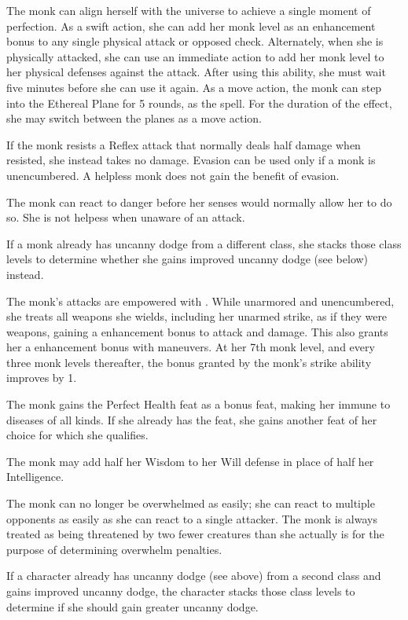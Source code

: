  The monk can align herself with the universe to achieve a single moment of perfection. As a swift action, she can add her monk level as an enhancement bonus to any single physical attack or opposed check. Alternately, when she is physically attacked, she can use an immediate action to add her monk level to her physical defenses against the attack. After using this ability, she must wait five minutes before she can use it again.
 As a move action, the monk can step into the Ethereal Plane for 5 rounds, as the  spell. For the duration of the effect, she may switch between the planes as a move action.

 If the monk resists a Reflex attack that normally deals half damage when resisted, she instead takes no damage. Evasion can be used only if a monk is unencumbered. A helpless monk does not gain the benefit of evasion.

 The monk can react to danger before her senses would normally allow her to do so. She is not helpess when unaware of an attack.

If a monk already has uncanny dodge from a different class, she stacks those class levels to determine whether she gains improved uncanny dodge (see below) instead.

 The monk's attacks are empowered with \ki. While unarmored and unencumbered, she treats all weapons she wields, including her unarmed strike, as if they were  weapons, gaining a  enhancement bonus to attack and damage. This also grants her a  enhancement bonus with maneuvers. At her 7th monk level, and every three monk levels thereafter, the bonus granted by the monk's \ki strike ability improves by 1. 

 The monk gains the Perfect Health feat as a bonus feat, making her immune to diseases of all kinds. If she already has the feat, she gains another feat of her choice for which she qualifies.

 The monk may add half her Wisdom to her Will defense in place of half her Intelligence.

 The monk can no longer be overwhelmed as easily; she can react to multiple opponents as easily as she can react to a single attacker. The monk is always treated as being threatened by two fewer creatures than she actually is for the purpose of determining overwhelm penalties.
\par If a character already has uncanny dodge (see above) from a second class and gains improved uncanny dodge, the character stacks those class levels to determine if she should gain greater uncanny dodge.

